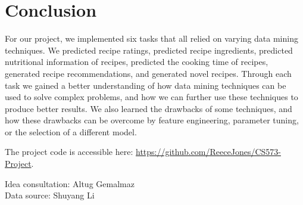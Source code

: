 \documentclass[sigconf]{acmart}
\begin{document}
\section{Conclusion}
For our project, we implemented six tasks that all relied on varying data mining techniques. We predicted recipe ratings, predicted recipe ingredients, predicted nutritional information of recipes, predicted the cooking time of recipes, generated recipe recommendations, and generated novel recipes. Through each task we gained a better understanding of how data mining techniques can be used to solve complex problems, and how we can further use these techniques to produce better results. We also learned the drawbacks of some techniques, and how these drawbacks can be overcome by feature engineering, parameter tuning, or the selection of a different model.

The project code is accessible here: \url{https://github.com/ReeceJones/CS573-Project}.

%
\begin{acks}
Idea consultation: Altug Gemalmaz\\
Data source: Shuyang Li
\end{acks}




\end{document}
